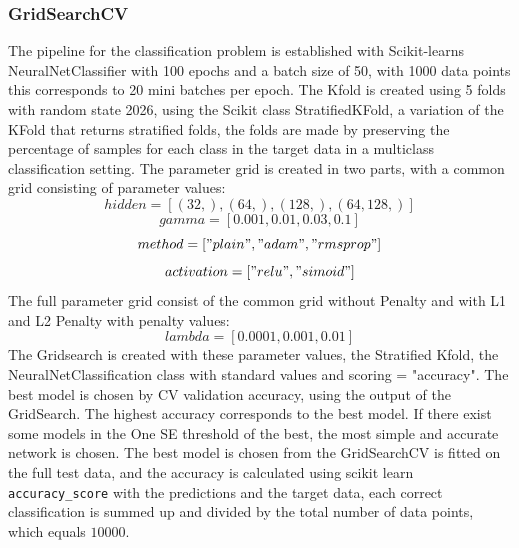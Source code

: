 \subsubsection{GridSearchCV}
The pipeline for the classification problem is established with Scikit-learns NeuralNetClassifier
with 100 epochs and a batch size of 50, with 1000 data points this corresponds to 20 mini batches per epoch.
The Kfold is created using 5 folds with random state 2026, using the Scikit class StratifiedKFold, a variation
of the KFold that returns stratified folds, the folds are made by preserving the percentage of samples
for each class in the target data in a multiclass classification setting. \cite{StratifiedKFold}
The parameter grid is created in two parts, with a common grid consisting of parameter values:
$$hidden = [(32, ), (64, ), (128,), (64,128,)]$$
$$gamma = [0.001, 0.01, 0.03, 0.1]$$
$$method = ["plain", "adam", "rmsprop"]$$
$$activation = ["relu", "simoid"]$$
The full parameter grid consist of the common grid without Penalty and with L1 and L2 Penalty
with penalty values:
$$lambda = [0.0001, 0.001, 0.01]$$
The Gridsearch is created with these parameter values, the Stratified Kfold, the NeuralNetClassification class
with standard values and scoring = "accuracy". 
The best model is chosen by CV validation accuracy, using the output of the GridSearch. The highest accuracy corresponds to the best model.
If there exist some models in the One SE threshold of the best, the most simple and accurate network is chosen.
The best model is chosen from the GridSearchCV is fitted on the full test data, and the accuracy
is calculated using scikit learn \texttt{accuracy\_score} with the predictions and the target data, 
each correct classification is summed up and divided by the total number of data points, which equals $10 000$.
